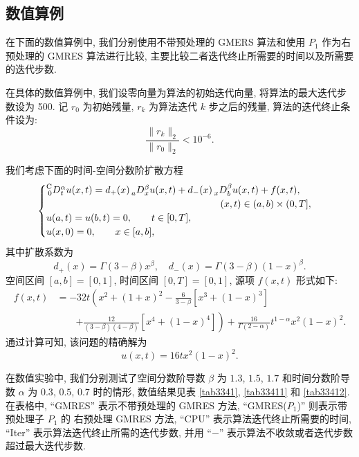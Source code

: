 \documentclass{ecnumaster}
\begin{document}
\subsection{数值算例} %
在下面的数值算例中,
我们分别使用不带预处理的 GMERS 算法和使用 $P_1$ 作为右预处理的 GMRES 算法进行比较,
主要比较二者迭代终止所需要的时间以及所需要的迭代步数.

在具体的数值算例中, 我们设零向量为算法的初始迭代向量, 将算法的最大迭代步数设为 500.
记 $r_0$ 为初始残量, $r_k$ 为算法迭代 $k$ 步之后的残量, 算法的迭代终止条件设为:
\begin{equation}\nonumber
\frac{\|r_{k}\|_2}{\|r_0\|_2}<10^{-6}.
\end{equation}

\bigskip
\begin{example}\label{example-1}
我们考虑下面的时间-空间分数阶扩散方程 %
\begin{equation}
\begin{cases}
\prescript{{\mathrm{C}}}{0}D_t^{\alpha} u(x, t) = d_+(x) \prescript{}{a}D_x^\beta u(x, t) + d_-(x) \prescript{}{x}D_b^\beta u(x, t) + f(x, t), \\
\qquad \qquad \qquad \qquad \qquad \qquad \qquad \qquad \qquad (x, t) \in (a, b) \times (0, T],\\
u(a, t) = u(b, t) = 0,  \qquad t \in [0, T],\\
u(x, 0) = 0, \qquad x \in [a, b],
 \end{cases}
\end{equation}
其中扩散系数为
\begin{equation}
  d_+(x) = \Gamma(3-\beta)x^{\beta}, \quad d_-(x) = \Gamma(3-\beta)(1-x)^{\beta}.
\end{equation}
空间区间 $[a, b] = [0, 1]$, 时间区间 $[0, T] = [0, 1]$,
源项 $f(x, t)$ 形式如下:
\begin{align*}
  f(x, t)
  & = -32t\left( x^2 + (1+x)^2 - \frac{6}{3-\beta}[x^3 + (1-x)^3] \right. \\
  &\quad\quad\left. + \frac{12}{(3-\beta)(4-\beta)}[x^4 +(1-x)^4] \right)
   + \frac{16}{\Gamma(2-\alpha)} t^{1-\alpha} x^2(1-x)^2.
\end{align*}
通过计算可知, 该问题的精确解为
\begin{equation}
  u(x, t) = 16tx^2(1-x)^2.
\end{equation}
\end{example}

在数值实验中, 我们分别测试了空间分数阶导数 $\beta$ 为 $1.3$, $1.5$, $1.7$
和时间分数阶导数 $\alpha$ 为 $0.3$, $0.5$, $0.7$ 时的情形,
数值结果见表 \ref{tab3341}, \ref{tab33411} 和 \ref{tab33412}.
在表格中, “GMRES” 表示不带预处理的 GMRES 方法,
“GMRES($P_1$)” 则表示带预处理子 $P_1$ 的 右预处理 GMRES 方法,
“CPU” 表示算法迭代终止所需要的时间,
“Iter” 表示算法迭代终止所需的迭代步数,
并用 “$-$” 表示算法不收敛或者迭代步数超过最大迭代步数.
\end{document}
